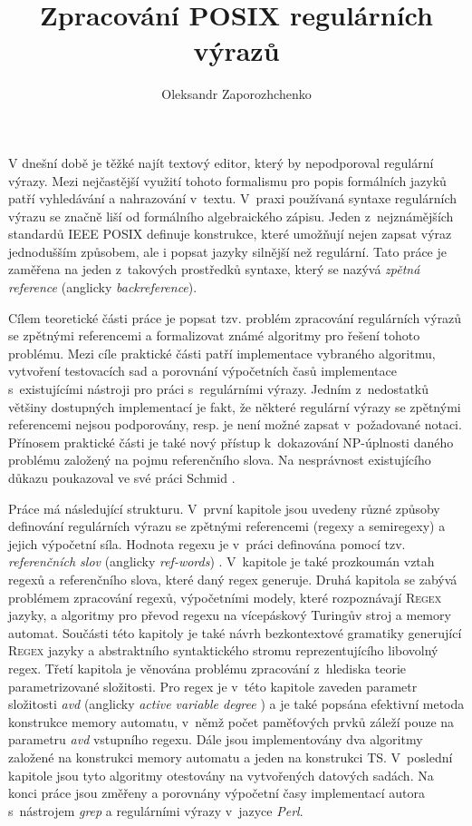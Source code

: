 \documentclass[thesis=B,czech]{FITthesis}[2019/12/23]
\title{Zpracování POSIX regulárních výrazů}
\author{Oleksandr Zaporozhchenko} %
\theoremstyle{definition}
\begin{document}

\begin{introduction}
V dnešní době je těžké najít textový editor, který by nepodporoval regulární výrazy. Mezi nejčastější využití tohoto formalismu pro popis formálních jazyků patří vyhledávání a nahrazování v~textu. V~praxi používaná syntaxe regulárních výrazu se značně liší od formálního algebraického zápisu. Jeden z~nejznámějších standardů IEEE POSIX \cite{posix} definuje konstrukce, které umožňují nejen zapsat výraz jednodušším způsobem, ale i popsat jazyky silnější než regulární. Tato práce je zaměřena na jeden z~takových prostředků syntaxe, který se nazývá \emph{zpětná reference} (anglicky \emph{backreference}).

Cílem teoretické části práce je popsat tzv. problém zpracování regulárních výrazů se zpětnými referencemi a formalizovat známé algoritmy pro řešení tohoto problému. Mezi cíle praktické části patří implementace vybraného algoritmu, vytvoření testovacích sad a porovnání výpočetních časů implementace s~existujícími nástroji pro práci s~regulárními výrazy. Jedním z~nedostatků většiny dostupných implementací je fakt, že některé regulární výrazy se zpětnými referencemi nejsou podporovány, resp. je není možné zapsat v~požadované notaci. Přínosem praktické části je také nový přístup k~dokazování NP-úplnosti daného problému založený na pojmu referenčního slova. Na nesprávnost existujícího důkazu \cite[s. 289]{alfred2014algorithms} poukazoval ve své práci Schmid \cite[s. 83]{schmidregex}.

Práce má následující strukturu. V~první kapitole jsou uvedeny různé způsoby definování regulárních výrazu se zpětnými referencemi (regexy a semiregexy) a jejich výpočetní síla. Hodnota regexu je v~práci definována pomocí tzv. \emph{referenčních slov} (anglicky \emph{ref-words}) \cite{schmidrefwords}. V~kapitole je také prozkoumán vztah regexů a referenčního slova, které daný regex generuje. Druhá kapitola se zabývá problémem zpracování regexů, výpočetními modely, které rozpoznávají \textsc{Regex} jazyky, a algoritmy pro převod regexu na vícepáskový Turingův stroj a memory automat. Součásti této kapitoly je také návrh bezkontextové gramatiky generující \textsc{Regex} jazyky a abstraktního syntaktického stromu reprezentujícího libovolný regex. Třetí kapitola je věnována problému zpracování z~hlediska teorie parametrizované složitosti. Pro regex je v~této kapitole zaveden parametr složitosti \emph{avd} (anglicky \emph{active variable degree} \cite{schmidref}) a je také popsána efektivní metoda konstrukce memory automatu, v~němž počet paměťových prvků záleží pouze na parametru \emph{avd} vstupního regexu. Dále jsou implementovány dva algoritmy založené na konstrukci memory automatu a jeden na konstrukci TS. V~poslední kapitole jsou tyto algoritmy otestovány na vytvořených datových sadách. Na konci práce jsou změřeny a porovnány výpočetní časy implementací autora s~nástrojem \emph{grep} a regulárními výrazy v~jazyce \emph{Perl}. 

\end{introduction}
\end{document}
